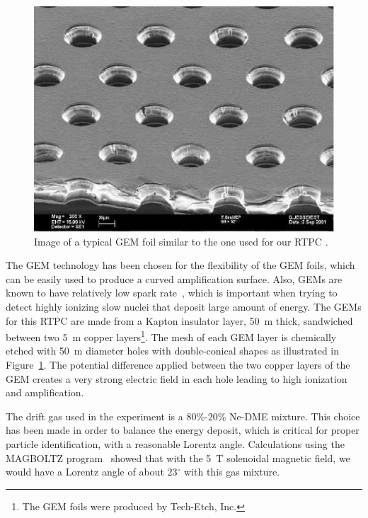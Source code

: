 \documentclass[preprint,5p]{elsarticle}
\begin{document}
\begin{figure}[tbp]
\centering
\includegraphics[scale=0.70]{GEM_photo.jpg}
\caption{Image of a typical GEM foil similar to the one used for our RTPC 
\cite{Sauli:2016eeu}.} 
   \label{fig:GEMs}
\end{figure}

The GEM technology has been chosen for the flexibility of the GEM foils,
which can be easily used to produce a curved amplification surface. Also, GEMs 
are known to have relatively low spark rate~\cite{Bachmann:2000kj}, which is 
important when trying to detect highly ionizing slow nuclei that deposit large 
amount of energy. The GEMs for this RTPC are made from a Kapton insulator 
layer, 50~\textmu{}m thick, sandwiched between two 5~\textmu{}m copper 
layers\footnote{The GEM foils were produced by Tech-Etch, Inc.}. The mesh of 
each GEM layer is chemically etched with 50~\textmu{}m diameter holes with 
double-conical shapes as illustrated in Figure~\ref{fig:GEMs}. The potential 
difference applied between the two copper layers of the GEM creates a very 
strong electric field in each hole leading to high ionization and 
amplification. 

The drift gas used in the experiment is a 80\%-20\% Ne-DME mixture. This choice 
has been made in order to balance the energy deposit, which is critical
for proper particle identification, with a reasonable
Lorentz angle. Calculations using the MAGBOLTZ program~\cite{Biagi:1999nwa} 
showed that with the 5~T solenoidal magnetic field, we would have a Lorentz 
angle of about 23$^\circ$ with this gas mixture.
\end{document}

